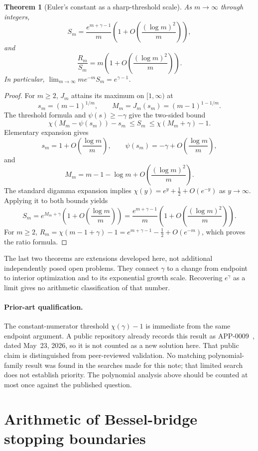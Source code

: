 \documentclass[11pt,a4paper]{article}
\newtheorem{theorem}{Theorem}[section]
\theoremstyle{definition}
\theoremstyle{remark}
\numberwithin{equation}{section}
\begin{document}
\begin{theorem}[Euler's constant as a sharp-threshold scale]
\label{p1:thm:sparse-scale}
As $m\to\infty$ through integers,
\[
 S_m=\frac{e^{m+\gamma-1}}m
 \left(1+O\!\left(\frac{(\log m)^2}{m}\right)\right),
\]
and
\[
 \frac{R_m}{S_m}
 =m\left(1+O\!\left(\frac{(\log m)^2}{m}\right)\right).
\]
In particular, $\displaystyle\lim_{m\to\infty}m e^{-m}S_m=e^{\gamma-1}$.
\end{theorem}
\begin{proof}
For $m\ge2$, $J_m$ attains its maximum on $[1,\infty)$ at
\[
 s_m=(m-1)^{1/m},\qquad M_m=J_m(s_m)=(m-1)^{1-1/m}.
\]
The threshold formula and $\psi(s)\ge-\gamma$ give the two-sided bound
\[
 \chi(M_m-\psi(s_m))-s_m\ \le S_m\ \le\chi(M_m+\gamma)-1.
\]
Elementary expansion gives
\[
 s_m=1+O\!\left(\frac{\log m}{m}\right),\qquad
 \psi(s_m)=-\gamma+O\!\left(\frac{\log m}{m}\right),
\]
and
\[
 M_m=m-1-\log m+O\!\left(\frac{(\log m)^2}{m}\right).
\]
The standard digamma expansion implies
$\chi(y)=e^y+\tfrac12+O(e^{-y})$ as $y\to\infty$.
Applying it to both bounds yields
\[
 S_m=e^{M_m+\gamma}\left(1+O\!\left(\frac{\log m}{m}\right)\right)
 =\frac{e^{m+\gamma-1}}m
 \left(1+O\!\left(\frac{(\log m)^2}{m}\right)\right).
\]
For $m\ge2$, $R_m=\chi(m-1+\gamma)-1
=e^{m+\gamma-1}-\tfrac12+O(e^{-m})$, which proves the ratio formula.
\end{proof}

The last two theorems are extensions developed here, not additional independently posed open problems. They connect $\gamma$ to a change from endpoint to interior optimization and to its exponential growth scale. Recovering $e^\gamma$ as a limit gives no arithmetic classification of that number.

\paragraph{Prior-art qualification.}
The constant-numerator threshold $\chi(\gamma)-1$ is immediate from the same endpoint argument. A public repository already records this result as APP-0009~\cite{p1:pudim2026}, dated May~23, 2026, so it is not counted as a new solution here. That public claim is distinguished from peer-reviewed validation. No matching polynomial-family result was found in the searches made for this note; that limited search does not establish priority. The polynomial analysis above should be counted at most once against the published question.

\section{Arithmetic of Bessel-bridge stopping boundaries}
\label{p1:sec:bessel-arithmetic}
\end{document}
